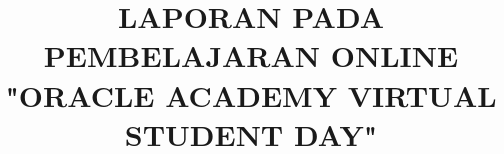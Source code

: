 \documentclass[a4paper, 12pt]{article}
\begin{document}
\title{\textbf{LAPORAN PADA PEMBELAJARAN ONLINE "ORACLE ACADEMY VIRTUAL STUDENT DAY"}}
\date{}
\end{document}
